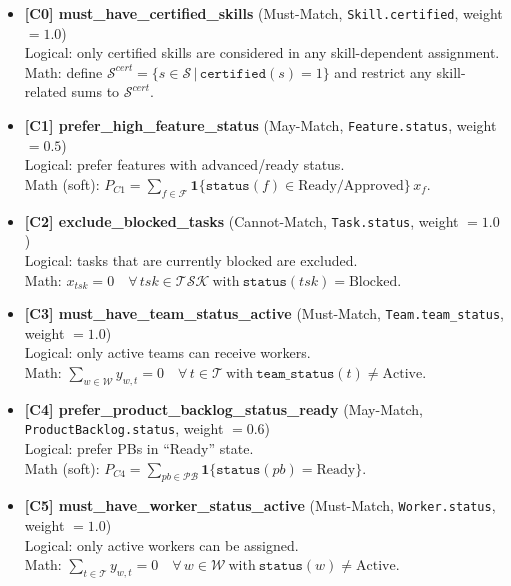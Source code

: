\documentclass[11pt,a4paper]{article}
\begin{document}
\begin{itemize}[leftmargin=*]
  \item \textbf{[C0] must\_have\_certified\_skills} (Must-Match, \texttt{Skill.certified}, weight $=1.0$)\\
  Logical: only certified skills are considered in any skill-dependent assignment.\\
  Math: define $\mathcal{S}^{cert}=\{s\in\mathcal{S}\,|\,\texttt{certified}(s)=1\}$ and restrict any skill-related sums to $\mathcal{S}^{cert}$.

  \item \textbf{[C1] prefer\_high\_feature\_status} (May-Match, \texttt{Feature.status}, weight $=0.5$)\\
  Logical: prefer features with advanced/ready status.\\
  Math (soft): $P_{C1}= \sum_{f\in\mathcal{F}} \mathbf{1}\{\texttt{status}(f)\in \text{Ready/Approved}\}\, x_f.$

  \item \textbf{[C2] exclude\_blocked\_tasks} (Cannot-Match, \texttt{Task.status}, weight $=1.0$)\\
  Logical: tasks that are currently blocked are excluded.\\
  Math: $x_{tsk}=0\quad \forall\, tsk\in\mathcal{TSK}\ \text{with}\ \texttt{status}(tsk)=\text{Blocked}.$

  \item \textbf{[C3] must\_have\_team\_status\_active} (Must-Match, \texttt{Team.team\_status}, weight $=1.0$)\\
  Logical: only active teams can receive workers.\\
  Math: $\sum_{w\in\mathcal{W}} y_{w,t} = 0 \quad \forall\, t\in\mathcal{T}\ \text{with}\ \texttt{team\_status}(t)\neq \text{Active}.$

  \item \textbf{[C4] prefer\_product\_backlog\_status\_ready} (May-Match, \texttt{ProductBacklog.status}, weight $=0.6$)\\
  Logical: prefer PBs in ``Ready'' state.\\
  Math (soft): $P_{C4}=\sum_{pb\in\mathcal{PB}} \mathbf{1}\{\texttt{status}(pb)=\text{Ready}\}.$

  \item \textbf{[C5] must\_have\_worker\_status\_active} (Must-Match, \texttt{Worker.status}, weight $=1.0$)\\
  Logical: only active workers can be assigned.\\
  Math: $\sum_{t\in\mathcal{T}} y_{w,t}=0 \quad \forall\, w\in\mathcal{W}\ \text{with}\ \texttt{status}(w)\neq \text{Active}.$


\end{itemize}
\end{document}
